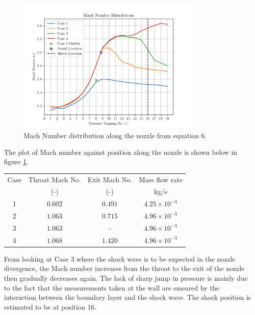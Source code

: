 \documentclass[8pt]{article}
\begin{document}
\begin{figure}[H]
    \centering
    \includegraphics[width=0.8\textwidth]{mach_number_distribution_corrected.png}
    \caption{Mach Number distribution along the nozzle from equation 6.}
    \label{fig:figure5}
\end{figure}
The plot of Mach number against position along the nozzle is shown below in figure \ref{fig:figure5}.

\begin{center}
    \begin{tabular}{|c|c|c|c|}
    \hline 
    Case & Throat Mach No.  & Exit Mach No. & Mass flow rate\\
     & (-) & (-) & kg/s \\
    \hline 
    1 & $0.602$ & $0.491$ & $ 4.25 \times 10^{-3} $ \\
    2 & $1.063$ & $0.715$ & $ 4.96 \times 10^{-3} $ \\
    3 & $1.063$ & - & $ 4.96 \times 10^{-3} $ \\
    4 & $1.068$ & $1.420$ & $ 4.96 \times 10^{-3} $ \\
    \hline
    \end{tabular}
    \label{tab:1}
\end{center}

From looking at Case 3 where the shock wave is to be expected in the nozzle divergence, the Mach number increases from the throat to the exit of the nozzle then gradually decreases again.
The lack of sharp jump in pressure is mainly due to the fact that the measurements taken at the wall are smeared by the interaction between the boundary layer and the shock wave.
The shock position is estimated to be at position 16.
\end{document}
